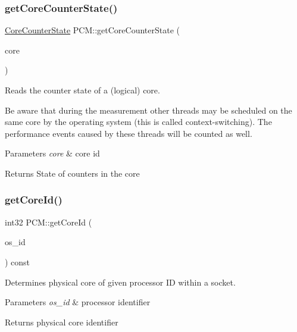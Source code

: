 \subsubsection{\texorpdfstring{get\+Core\+Counter\+State()}{getCoreCounterState()}}
{\footnotesize\ttfamily \mbox{\hyperlink{class_core_counter_state}{Core\+Counter\+State}} P\+C\+M\+::get\+Core\+Counter\+State (\begin{DoxyParamCaption}\item[{uint32}]{core }\end{DoxyParamCaption})}



Reads the counter state of a (logical) core. 

Be aware that during the measurement other threads may be scheduled on the same core by the operating system (this is called context-\/switching). The performance events caused by these threads will be counted as well.


\begin{DoxyParams}{Parameters}
{\em core} & core id \\
\hline
\end{DoxyParams}
\begin{DoxyReturn}{Returns}
State of counters in the core 
\end{DoxyReturn}
\mbox{\label{class_p_c_m_a90eb072bebf4be22bce23d550983f6fe}} 
\subsubsection{\texorpdfstring{get\+Core\+Id()}{getCoreId()}}
{\footnotesize\ttfamily int32 P\+C\+M\+::get\+Core\+Id (\begin{DoxyParamCaption}\item[{uint32}]{os\+\_\+id }\end{DoxyParamCaption}) const\hspace{0.3cm}{\ttfamily [inline]}}



Determines physical core of given processor ID within a socket. 


\begin{DoxyParams}{Parameters}
{\em os\+\_\+id} & processor identifier \\
\hline
\end{DoxyParams}
\begin{DoxyReturn}{Returns}
physical core identifier 
\end{DoxyReturn}
\mbox{\label{class_p_c_m_a5f8c7d4c978238706fe74ec00c803f9a}} 
